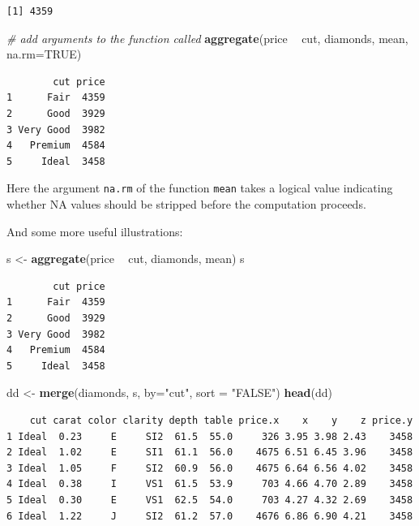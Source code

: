 \documentclass[
]{book}
\newenvironment{Shaded}{\begin{snugshade}}{\end{snugshade}}
\newcommand{\CommentTok}[1]{\textcolor[rgb]{0.56,0.35,0.01}{\textit{#1}}}
\newcommand{\DataTypeTok}[1]{\textcolor[rgb]{0.13,0.29,0.53}{#1}}
\newcommand{\KeywordTok}[1]{\textcolor[rgb]{0.13,0.29,0.53}{\textbf{#1}}}
\newcommand{\NormalTok}[1]{#1}
\newcommand{\OperatorTok}[1]{\textcolor[rgb]{0.81,0.36,0.00}{\textbf{#1}}}
\newcommand{\OtherTok}[1]{\textcolor[rgb]{0.56,0.35,0.01}{#1}}
\newcommand{\StringTok}[1]{\textcolor[rgb]{0.31,0.60,0.02}{#1}}
\begin{document}
\begin{verbatim}
[1] 4359
\end{verbatim}

\begin{Shaded}
\begin{Highlighting}[]
\CommentTok{# add arguments to the function called}
\KeywordTok{aggregate}\NormalTok{(price }\OperatorTok{~}\StringTok{ }\NormalTok{cut, diamonds, mean, }\DataTypeTok{na.rm=}\OtherTok{TRUE}\NormalTok{)}
\end{Highlighting}
\end{Shaded}

\begin{verbatim}
        cut price
1      Fair  4359
2      Good  3929
3 Very Good  3982
4   Premium  4584
5     Ideal  3458
\end{verbatim}

Here the argument \texttt{na.rm} of the function \texttt{mean} takes a logical value indicating whether NA values should be stripped before the computation proceeds.

And some more useful illustrations:

\begin{Shaded}
\begin{Highlighting}[]
\NormalTok{s <-}\StringTok{ }\KeywordTok{aggregate}\NormalTok{(price }\OperatorTok{~}\StringTok{ }\NormalTok{cut, diamonds, mean)}
\NormalTok{s}
\end{Highlighting}
\end{Shaded}

\begin{verbatim}
        cut price
1      Fair  4359
2      Good  3929
3 Very Good  3982
4   Premium  4584
5     Ideal  3458
\end{verbatim}

\begin{Shaded}
\begin{Highlighting}[]
\NormalTok{dd <-}\StringTok{ }\KeywordTok{merge}\NormalTok{(diamonds, s, }\DataTypeTok{by=}\StringTok{"cut"}\NormalTok{, }\DataTypeTok{sort =} \StringTok{"FALSE"}\NormalTok{)}
\KeywordTok{head}\NormalTok{(dd)}
\end{Highlighting}
\end{Shaded}

\begin{verbatim}
    cut carat color clarity depth table price.x    x    y    z price.y
1 Ideal  0.23     E     SI2  61.5  55.0     326 3.95 3.98 2.43    3458
2 Ideal  1.02     E     SI1  61.1  56.0    4675 6.51 6.45 3.96    3458
3 Ideal  1.05     F     SI2  60.9  56.0    4675 6.64 6.56 4.02    3458
4 Ideal  0.38     I     VS1  61.5  53.9     703 4.66 4.70 2.89    3458
5 Ideal  0.30     E     VS1  62.5  54.0     703 4.27 4.32 2.69    3458
6 Ideal  1.22     J     SI2  61.2  57.0    4676 6.86 6.90 4.21    3458
\end{verbatim}
\end{document}
